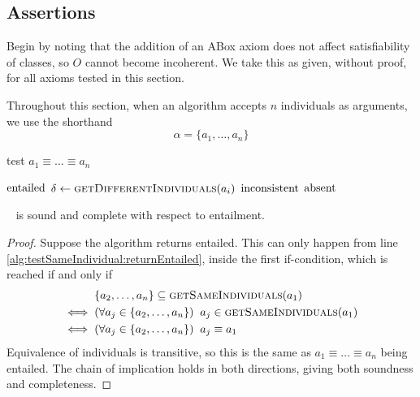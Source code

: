 \documentclass[paper.tex]{subfiles}
\begin{document}
\subsection{Assertions}
\label{sec:algorithms:assert}

Begin by noting that the addition of an ABox axiom does not affect satisfiability of classes, so $O$ cannot become incoherent.  We take this as given, without proof, for all axioms tested in this section.

Throughout this section, when an algorithm accepts $n$ individuals as arguments, we use the shorthand
\[\alpha = \{a_1, \ldots, a_n\}\]

\todo[notation]

\begin{algorithm}[H]
  \caption{test $a_1 \equiv \ldots \equiv a_n$}
  \begin{algorithmic}[1]
    \raggedright
        \State \Return $\mathrm{entailed}$
        \label{alg:testSameIndividual:returnEntailed}
      \Else
          \State $\delta \gets \Call{getDifferentIndividuals}{a_i}$
            \State \Return $\mathrm{inconsistent}$
            \label{alg:testSameIndividual:returnInconsistent}
          \EndIf
        \EndFor
        \State \Return $\mathrm{absent}$
      \EndIf
    \EndFunction
  \end{algorithmic}
\end{algorithm}

\begin{proposition}
  \label{prop:testSameIndividualEntailed}
  \sloppy~
   is sound and complete with respect to entailment.
\end{proposition}
\begin{proof}
  Suppose the algorithm returns entailed.  This can only happen from line \ref{alg:testSameIndividual:returnEntailed}, inside the first if-condition, which is reached if and only if
  \begin{align*}
    & \{a_2, \ldots, a_n\} \subseteq \Call{getSameIndividuals}{a_1} \\
    \iff{}&(\forall a_j \in \{a_2, \ldots, a_n\}) \;\; a_j \in \Call{getSameIndividuals}{a_1} \\
    \iff{}& (\forall a_j \in \{a_2, \ldots, a_n\}) \;\; a_j \equiv a_1
  \end{align*}
  Equivalence of individuals is transitive, so this is the same as $a_1 \equiv \ldots \equiv a_n$ being entailed.  The chain of implication holds in both directions, giving both soundness and completeness.
\end{proof}
\end{document}
